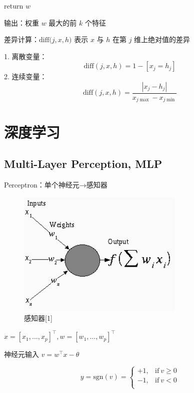 \documentclass[openany,a4paper,12pt]{ctexbook}
\theoremstyle{kaiti}
\theoremstyle{normal}
\begin{document}
return $w$

输出：权重 $w$ 最大的前 $k$ 个特征

差异计算：$\mathrm{diff(}j,x,h)$ 表示 $x$ 与 $h$ 在第 $j$ 维上绝对值的差异

1. 离散变量：
  \begin{equation}
  \mathrm{diff}(j,x,h)=1-\left[x_j=h_j \right]
  \end{equation}
2. 连续变量：
  \begin{equation}
  \mathrm{diff}(j,x,h)=\frac{|x_j-h_j|}{x_{j\max}-x_{j\min}}
  \end{equation}

\chapter{深度学习}

\section{Multi-Layer Perception, MLP}

Perceptron：单个神经元→感知器

\begin{figure}
  \centering
  \includegraphics[width=8cm]{1627808551310-8.1.png}
  \caption{感知器[1]}
\end{figure}

$x=\left[x_1,\dots ,x_p \right] ^{\top}, w=\left[w_1,\dots ,w_p \right] ^{\top}$

神经元输入 $v=w^{\top}x-\theta$

\begin{equation}
  y=\mathrm{sgn}(v)=
  \begin{cases}
    +1, &\mathrm{if}~v\geqslant 0\\
    -1, &\mathrm{if}~v< 0\\
  \end{cases}
\end{equation}
\end{document}
